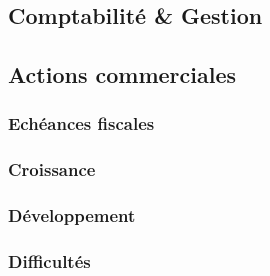 \documentclass[10pt]{article}
\begin{document}

\subsection{Comptabilité \& Gestion}
\label{sub:comptabilité_gestion}


\subsection{Actions commerciales}
\label{sub:actions_commerciales}


\subsubsection{Echéances fiscales}
\label{ssub:echéance_fiscales}

\subsubsection{Croissance}
\label{ssub:croissance}

\subsubsection{Développement}
\label{ssub:developpement}

\subsubsection{Difficultés}
\label{ssub:difficultés}






\end{document}
